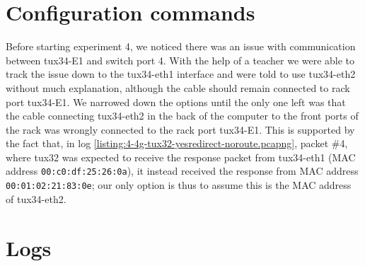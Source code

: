 \documentclass[a4paper, 11pt]{report}
\begin{document}
\restoregeometry

\chapter{Configuration commands} \label{sec:configuration}

Before starting experiment 4, we noticed there was an issue with communication between tux34-E1 and switch port 4.
With the help of a teacher we were able to track the issue down to the tux34-eth1 interface and were told to use tux34-eth2 without much explanation, although the cable should remain connected to rack port tux34-E1.
We narrowed down the options until the only one left was that the cable connecting tux34-eth2 in the back of the computer to the front ports of the rack was wrongly connected to the rack port tux34-E1.
This is supported by the fact that, in log \ref{listing:4-4g-tux32-yesredirect-noroute.pcapng}, packet \#4, where tux32 was expected to receive the response packet from tux34-eth1 (MAC address \texttt{00:c0:df:25:26:0a}), it instead received the response from MAC address \texttt{00:01:02:21:83:0e}; our only option is thus to assume this is the MAC address of tux34-eth2.







\fancyhfoffset{0pt}
\chapter{Logs}

\renewcommand{\thelstlisting}{%
  \thechapter.\thesubsection(\arabic{lstlisting})%
}
\end{document}
